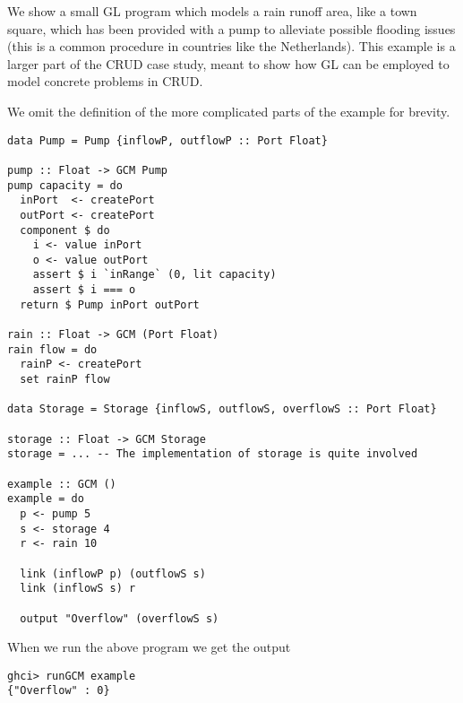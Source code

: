 We show a small GL program which models a rain runoff area,
like a town square, which has been provided with a pump to
alleviate possible flooding issues (this is a common procedure
in countries like the Netherlands). This example is a larger
part of the CRUD case study, meant to show how GL can be
employed to model concrete problems in CRUD.

We omit the definition of the
more complicated parts of the example for brevity.
\begin{verbatim}
data Pump = Pump {inflowP, outflowP :: Port Float}

pump :: Float -> GCM Pump
pump capacity = do
  inPort  <- createPort
  outPort <- createPort
  component $ do
    i <- value inPort
    o <- value outPort
    assert $ i `inRange` (0, lit capacity)
    assert $ i === o
  return $ Pump inPort outPort

rain :: Float -> GCM (Port Float)
rain flow = do
  rainP <- createPort
  set rainP flow

data Storage = Storage {inflowS, outflowS, overflowS :: Port Float}

storage :: Float -> GCM Storage
storage = ... -- The implementation of storage is quite involved

example :: GCM ()
example = do
  p <- pump 5
  s <- storage 4
  r <- rain 10

  link (inflowP p) (outflowS s)
  link (inflowS s) r

  output "Overflow" (overflowS s)
  \end{verbatim}

When we run the above program we get the output

\begin{verbatim}
ghci> runGCM example
{"Overflow" : 0}
\end{verbatim}

